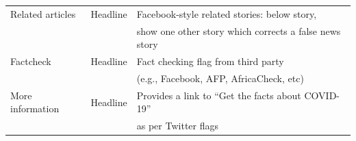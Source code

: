 \documentclass[letterpaper, 12pt, parskip=full,]{scrartcl}
\begin{document}
\begin{table}[H]
\begin{tabular}{l|l|l}
\\
Related articles                                                                                                       & Headline                                                                                                     & Facebook-style related stories: below story,\\ & & show one other story which corrects a false news story                                                                                                                                                                                                                                                                                             \\
Factcheck                                                                                                      & Headline                                                                                                     & Fact checking flag from third party\\ & & (e.g., Facebook, AFP, AfricaCheck, etc)
 \\
More information                                                                                                      & Headline                                                                                                     & Provides a link to ``Get the facts about COVID-19''\\ & & as per Twitter flags

\end{tabular}
\end{table}
\end{document}
